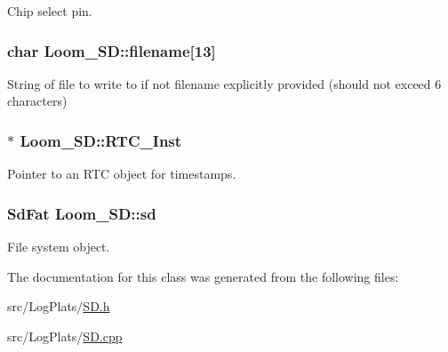 Chip select pin. 

\subsubsection[{\texorpdfstring{filename}{filename}}]{\setlength{\rightskip}{0pt plus 5cm}char Loom\+\_\+\+S\+D\+::filename\mbox{[}13\mbox{]}\hspace{0.3cm}{\ttfamily [protected]}}\hypertarget{class_loom___s_d_a970a01045c1d73b67f23982842249097}{}\label{class_loom___s_d_a970a01045c1d73b67f23982842249097}


String of file to write to if not filename explicitly provided (should not exceed 6 characters) 

\subsubsection[{\texorpdfstring{R\+T\+C\+\_\+\+Inst}{RTC_Inst}}]{$\ast$ Loom\+\_\+\+S\+D\+::\+R\+T\+C\+\_\+\+Inst\hspace{0.3cm}{\ttfamily [protected]}}\hypertarget{class_loom___s_d_a3dcce942e87eabc4e3912d1af283618c}{}\label{class_loom___s_d_a3dcce942e87eabc4e3912d1af283618c}


Pointer to an R\+TC object for timestamps. 

\subsubsection[{\texorpdfstring{sd}{sd}}]{\setlength{\rightskip}{0pt plus 5cm}Sd\+Fat Loom\+\_\+\+S\+D\+::sd\hspace{0.3cm}{\ttfamily [protected]}}\hypertarget{class_loom___s_d_a0602d9ef1a9b7f8b31870702bcb692fd}{}\label{class_loom___s_d_a0602d9ef1a9b7f8b31870702bcb692fd}


File system object. 



The documentation for this class was generated from the following files\+:\begin{DoxyCompactItemize}
\item 
src/\+Log\+Plats/\hyperlink{_s_d_8h}{S\+D.\+h}\item 
src/\+Log\+Plats/\hyperlink{_s_d_8cpp}{S\+D.\+cpp}\end{DoxyCompactItemize}
